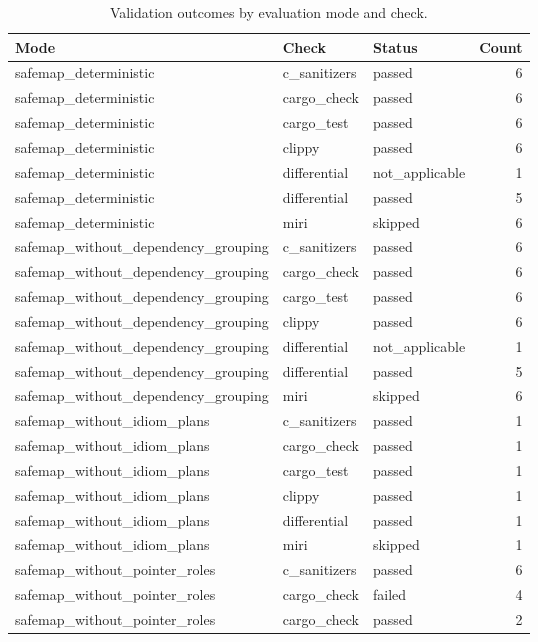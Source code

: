 \begin{table}[t]
\centering
\caption{Validation outcomes by evaluation mode and check.}
\label{tab:safemap-validation-statuses}
\begin{tabular}{lllr}
\hline
Mode & Check & Status & Count \\
\hline
safemap\_deterministic & c\_sanitizers & passed & 6 \\
safemap\_deterministic & cargo\_check & passed & 6 \\
safemap\_deterministic & cargo\_test & passed & 6 \\
safemap\_deterministic & clippy & passed & 6 \\
safemap\_deterministic & differential & not\_applicable & 1 \\
safemap\_deterministic & differential & passed & 5 \\
safemap\_deterministic & miri & skipped & 6 \\
safemap\_without\_dependency\_grouping & c\_sanitizers & passed & 6 \\
safemap\_without\_dependency\_grouping & cargo\_check & passed & 6 \\
safemap\_without\_dependency\_grouping & cargo\_test & passed & 6 \\
safemap\_without\_dependency\_grouping & clippy & passed & 6 \\
safemap\_without\_dependency\_grouping & differential & not\_applicable & 1 \\
safemap\_without\_dependency\_grouping & differential & passed & 5 \\
safemap\_without\_dependency\_grouping & miri & skipped & 6 \\
safemap\_without\_idiom\_plans & c\_sanitizers & passed & 1 \\
safemap\_without\_idiom\_plans & cargo\_check & passed & 1 \\
safemap\_without\_idiom\_plans & cargo\_test & passed & 1 \\
safemap\_without\_idiom\_plans & clippy & passed & 1 \\
safemap\_without\_idiom\_plans & differential & passed & 1 \\
safemap\_without\_idiom\_plans & miri & skipped & 1 \\
safemap\_without\_pointer\_roles & c\_sanitizers & passed & 6 \\
safemap\_without\_pointer\_roles & cargo\_check & failed & 4 \\
safemap\_without\_pointer\_roles & cargo\_check & passed & 2 \\

\end{tabular}
\end{table}
